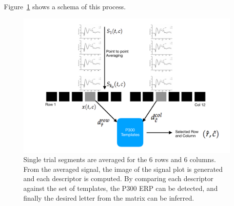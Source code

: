 \documentclass[entropy,article,submit,moreauthors,pdftex,10pt,a4paper]{mdpi}
\begin{document}
\begin{enumerate}

\end{enumerate}

Figure~\ref{fig:classification} shows a schema of this process. 
\begin{figure}[htp]
\centering
\includegraphics[width=15cm]{classificationgraph.pdf}
\caption{Single trial segments are averaged for the 6 rows and 6 columns. From the averaged signal, the image of the signal plot is generated and each descriptor is computed.  By comparing each descriptor against the set of templates, the P300 ERP can be detected, and finally the desired letter from the matrix can be inferred.}
\label{fig:classification}
\end{figure}
\end{document}
